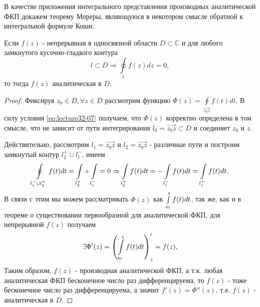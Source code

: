 
\begin{col-answer-preambule}
\end{col-answer-preambule}

В качестве приложения интегрального представления производных аналитической ФКП докажем теорему
Мореры, являющуюся в некотором смысле обратной к интегральной формуле Коши.

\begin{theorem}[Мореры]
  Если $f(z)$ - непрерывная в односвязной области $D \subset \mathbb{C}$ и для любого замкнутого
  кусочно-гладкого контура
  \begin{equation}
    \label{eq:lecture32-07}
    l \subset D \Rightarrow \oint\limits_lf(z)dz = 0,
  \end{equation}
  то тогда $f(z)$ аналитическая в $D$.
\end{theorem}
\begin{proof}
  Фиксируя $z_0 \in D, \forall z \in D$ рассмотрим функцию $\Phi(z) =
  \oint\limits_{\overrightarrow{z_0z}}f(t)dt$. В силу условия \eqref{eq:lecture32-07} получаем, что
  $\Phi(z)$ корректно определена в том смысле, что не зависит от пути интегрирования
  $l_0 = \overrightarrow{z_0z} \subset D$ и соединяет $z_0$ и $z$.

  Действительно, рассмотрим $l_1 = \overrightarrow{z_0z}$ и $l_2 = \overrightarrow{z_0z}$ -
  различные пути и построим замкнутый контур $l_2^+ \cup l_1^-$, имеем
  \begin{align*}
    \oint\limits_{l_1^- \cup l_2^+}f(t)dt = \int\limits_{l_2^+} + \int\limits_{l_1^-} = 0 \Rightarrow
    \int\limits_{l_2^+}f(t)dt = -\int\limits_{l_1^-}f(t)dt = \int\limits_{l_1^+}f(t)dt.
  \end{align*}
  В связи с этим мы можем рассматривать $\Phi(z)$ как $\int\limits_{z_0}^zf(t)dt$, так же, как и в теореме
  о существовании первообразной для аналитической ФКП, для непрерывной $f(z)$ получаем
  \begin{align*}
    \exists \Phi'(z) = \left( \int\limits_{z_0}^zf(t)dt \right)'_z = f(z),
  \end{align*}
  Таким образом, $f(z)$ - производная аналитической ФКП, а т.к. любая аналитическая ФКП бесконечное
  число раз дифференцируема, то $f(z)$ - тоже бесконечное число раз дифференцируема, а значит
  $f'(z) = \Phi''(z)$, т.е. $f(z)$ - аналитическая в $D$.
\end{proof}
